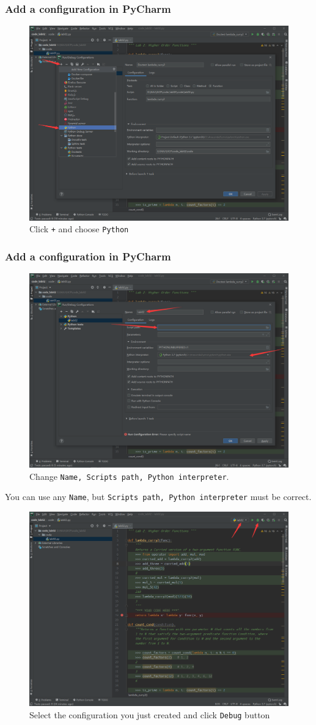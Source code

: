 \documentclass[aspectratio=169]{beamer}
\begin{document}
\begin{frame}
\frametitle{Add a configuration in PyCharm}

\begin{figure}
    \footnotesize
    \includegraphics[width=0.5\linewidth]{./imgs/config2.png}
    \caption{Click \texttt{+} and choose \texttt{Python}}
    \label{fig:config2}
\end{figure}
\end{frame}

\begin{frame}
\frametitle{Add a configuration in PyCharm}

\begin{figure}
    \centering
    \includegraphics[width=0.45\linewidth]{./imgs/config3.png}
    \caption{Change \texttt{Name, Scripts path, Python interpreter}.}
    \label{fig:config3}
\end{figure}

\vspace{-5mm}
\small{You can use any  \texttt{Name}, but \texttt{Scripts path, Python interpreter} must be correct.}

\end{frame}

\begin{frame}
\begin{figure}
    \centering
    \includegraphics[width=0.5\linewidth]{./imgs/run_debugger.png}
    \caption{Select the configuration you just created and click \texttt{Debug} button}
    \label{fig:config3}
\end{figure}
\end{frame}
\end{document}

